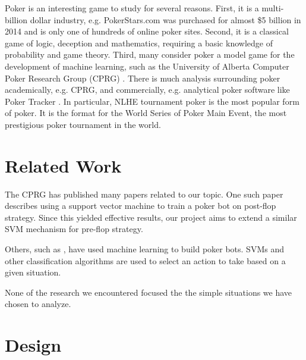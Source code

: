 \documentclass[twoside]{article}
\begin{document}
\begin{multicols}{2}
Poker is an interesting game to study for several reasons. First, it is a multi-billion dollar industry, e.g. PokerStars.com was purchased for almost \$5 billion in 2014 \cite{PokerStarsAcquired} and is only one of hundreds of online poker sites. Second, it is a classical game of logic, deception and mathematics, requiring a basic knowledge of probability and game theory. Third, many consider poker a model game for the development of machine learning, such as the University of Alberta Computer Poker Research Group (CPRG) \cite{SVMPoker}. There is much analysis surrounding poker academically, e.g. CPRG, and commercially, e.g. analytical poker software like Poker Tracker \cite{PokerTracker}. In particular, NLHE tournament poker is the most popular form of poker. It is the format for the World Series of Poker Main Event, the most prestigious poker tournament in the world. 


\section{Related Work}

The CPRG has published many papers related to our topic.
One such paper \cite{SVMPoker} describes using a support vector machine to train a poker bot on post-flop strategy. Since this yielded effective results, our project aims to extend a similar SVM mechanism for pre-flop strategy.

Others, such as \cite{holdemml}, have used machine learning to build poker bots. SVMs and other classification algorithms are used to select an action to take based on a given situation.

None of the research we encountered focused the the simple situations we have chosen to analyze.


\section{Design}


\end{multicols}
\end{document}

